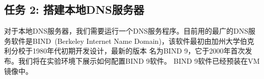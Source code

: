\begin{comment}
To avoid this, we should tell the DHCP client not to set the
DNS server automatically. This can be achieved using the following procedure (for \ubuntu
16.04):


\begin{enumerate}
  \item Go to \texttt{"System Settings"}, and click the \texttt{"Network"} icon.
  \item Choose the \texttt{"Wired"} tab, and click the
        \texttt{"Options"} button. A dialog will pop up.

  \item Click the \texttt{ "IPv4 Settings"} tab.  In the \texttt{"Method"} entry, choose
        \texttt{"Automatic (DHCP) Addresses Only"}, and then type the IP address of the local DNS
        server in the \texttt{"DNS servers"} entry. We do not need to type anything in the
        other two fields~(See Figure~\ref{dns:fig:user_machine_setup}).

  \item Finally, click the network icon on the top right corner of the desktop, and Select
    \texttt{"Wired connection 1"}. This will refresh the wired network connection and updates the changes.
    It should be noted that \texttt{"Wired connection 1"} is the name that we choose for our
    connection (see Figure~\ref{dns:fig:user_machine_setup});  we can choose a
    different name.
\end{enumerate}


\begin{figure}[htb]
  \begin{center}
    \texttt{[image: \\dnsFigs/config\_local\_dns\_server.pdf]}
  \end{center}
  \caption{User machine setup}
  \label{dns:fig:user_machine_setup}
\end{figure}

\end{comment}


\subsection{任务 2: 搭建本地DNS服务器}

对于本地DNS服务器，我们需要运行一个DNS服务程序。目前用的最广的DNS服务软件是BIND~(Berkeley Internet Name
Domain)，该软件最初由加州大学伯克利分校于1980年代初期开发设计，最新的版本
名为BIND 9，它于2000年首次发布。我们将在实验环境下展示如何配置BIND 9软件。
BIND 9软件已经预装在\ubuntu VM镜像中。


